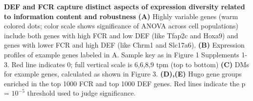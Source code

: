 \textbf{DEF and FCR capture distinct aspects of expression diversity related to information content and robustness} \textbf{(A)} Highly variable genes (warm colored dots; color scale shows significance of ANOVA across cell populations) include both genes with high FCR and low DEF (like Tfap2c and Hoxa9) and genes with lower FCR and high DEF (like Chrm1 and Slc17a6). \textbf{(B)} Expression profiles of example genes labeled in A. Sample key as in Figure 1 Supplements 1-3. Red line indicates 0; full vertical scale is 6,6,8,9 tpm (top to bottom) \textbf{(C)} DMs for example genes, calculated as shown in Figure 3. \textbf{(D),(E)} Hugo gene groups enriched in the top 1000 FCR and top 1000 DEF genes. Red lines indicate the p = $10^{-5}$ threshold used to judge significance.